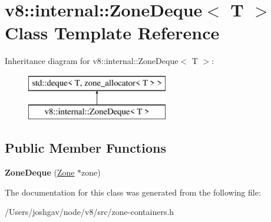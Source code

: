 \hypertarget{classv8_1_1internal_1_1_zone_deque}{}\section{v8\+:\+:internal\+:\+:Zone\+Deque$<$ T $>$ Class Template Reference}
\label{classv8_1_1internal_1_1_zone_deque}
Inheritance diagram for v8\+:\+:internal\+:\+:Zone\+Deque$<$ T $>$\+:\begin{figure}[H]
\begin{center}
\leavevmode
\includegraphics[height=2.000000cm]{classv8_1_1internal_1_1_zone_deque}
\end{center}
\end{figure}
\subsection*{Public Member Functions}
\begin{DoxyCompactItemize}
\item 
{\bfseries Zone\+Deque} (\hyperlink{classv8_1_1internal_1_1_zone}{Zone} $\ast$zone)\hypertarget{classv8_1_1internal_1_1_zone_deque_a8780f07350de9636469cebaafd6e93bf}{}\label{classv8_1_1internal_1_1_zone_deque_a8780f07350de9636469cebaafd6e93bf}

\end{DoxyCompactItemize}


The documentation for this class was generated from the following file\+:\begin{DoxyCompactItemize}
\item 
/\+Users/joshgav/node/v8/src/zone-\/containers.\+h\end{DoxyCompactItemize}
